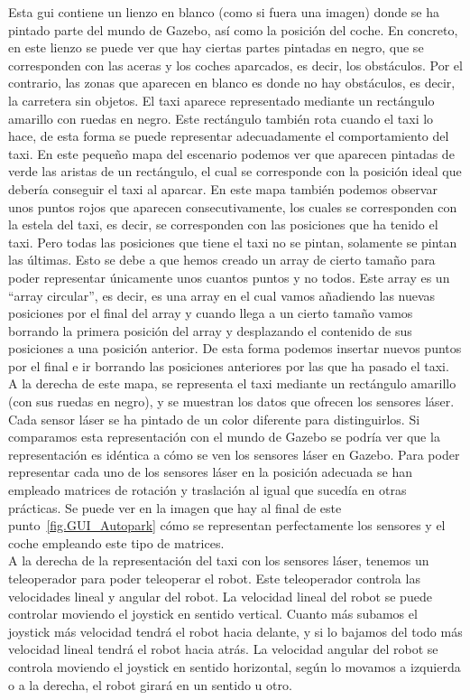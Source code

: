 Esta \acrshort{gui} contiene un lienzo en blanco (como si fuera una imagen) donde se ha pintado parte del mundo de Gazebo, así como la posición del coche. En concreto, en este lienzo se puede ver que hay ciertas partes pintadas en negro, que se corresponden con las aceras y los coches aparcados, es decir, los obstáculos. Por el contrario, las zonas que aparecen en blanco es donde no hay obstáculos, es decir, la carretera sin objetos. El taxi aparece representado mediante un rectángulo amarillo con ruedas en negro. Este rectángulo también rota cuando el taxi lo hace, de esta forma se puede representar adecuadamente el comportamiento del taxi. En este pequeño mapa del escenario podemos ver que aparecen pintadas de verde las aristas de un rectángulo, el cual se corresponde con la posición ideal que debería conseguir el taxi al aparcar. En este mapa también podemos observar unos puntos rojos que aparecen consecutivamente, los cuales se corresponden con la estela del taxi, es decir, se corresponden con las posiciones que ha tenido el taxi. Pero todas las posiciones que tiene el taxi no se pintan, solamente se pintan las últimas. Esto se debe a que hemos creado un array de cierto tamaño para poder representar únicamente unos cuantos puntos y no todos. Este array es un ``array circular'', es decir, es una array en el cual vamos añadiendo las nuevas posiciones por el final del array y cuando llega a un cierto tamaño vamos borrando la primera posición del array y desplazando el contenido de sus posiciones a una posición anterior. De esta forma podemos insertar nuevos puntos por el final e ir borrando las posiciones anteriores por las que ha pasado el taxi.\\

A la derecha de este mapa, se representa el taxi mediante un rectángulo amarillo (con sus ruedas en negro), y se muestran los datos que ofrecen los sensores láser. Cada sensor láser se ha pintado de un color diferente para distinguirlos. Si comparamos esta representación con el mundo de Gazebo se podría ver que la representación es idéntica a cómo se ven los sensores láser en Gazebo. Para poder representar cada uno de los sensores láser en la posición adecuada se han empleado matrices de rotación y traslación al igual que sucedía en otras prácticas. Se puede ver en la imagen que hay al final de este punto~\ref{fig.GUI_Autopark} cómo se representan perfectamente los sensores y el coche empleando este tipo de matrices. \\

A la derecha de la representación del taxi con los sensores láser, tenemos un teleoperador para poder teleoperar el robot. Este teleoperador controla las velocidades lineal y angular del robot. La velocidad lineal del robot se puede controlar moviendo el joystick en sentido vertical. Cuanto más subamos el joystick más velocidad tendrá el robot hacia delante, y si lo bajamos del todo más velocidad lineal tendrá el robot hacia atrás. La velocidad angular del robot se controla moviendo el joystick en sentido horizontal, según lo movamos a izquierda o a la derecha, el robot girará en un sentido u otro.\\

